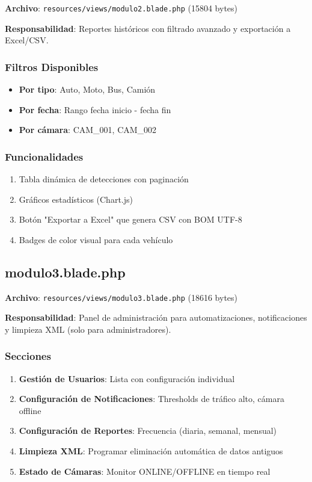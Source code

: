 \documentclass[12pt,a4paper]{article}
\begin{document}
\textbf{Archivo}: \texttt{resources/views/modulo2.blade.php} (15804 bytes)

\textbf{Responsabilidad}: Reportes históricos con filtrado avanzado y exportación a Excel/CSV.

\subsubsection{Filtros Disponibles}

\begin{itemize}
    \item \textbf{Por tipo}: Auto, Moto, Bus, Camión
    \item \textbf{Por fecha}: Rango fecha inicio - fecha fin
    \item \textbf{Por cámara}: CAM\_001, CAM\_002
\end{itemize}

\subsubsection{Funcionalidades}

\begin{enumerate}
    \item Tabla dinámica de detecciones con paginación
    \item Gráficos estadísticos (Chart.js)
    \item Botón "Exportar a Excel" que genera CSV con BOM UTF-8
    \item Badges de color visual para cada vehículo
\end{enumerate}

\subsection{modulo3.blade.php}

\textbf{Archivo}: \texttt{resources/views/modulo3.blade.php} (18616 bytes)

\textbf{Responsabilidad}: Panel de administración para automatizaciones, notificaciones y limpieza XML (solo para administradores).

\subsubsection{Secciones}

\begin{enumerate}
    \item \textbf{Gestión de Usuarios}: Lista con configuración individual
    \item \textbf{Configuración de Notificaciones}: Thresholds de tráfico alto, cámara offline
    \item \textbf{Configuración de Reportes}: Frecuencia (diaria, semanal, mensual)
    \item \textbf{Limpieza XML}: Programar eliminación automática de datos antiguos
    \item \textbf{Estado de Cámaras}: Monitor ONLINE/OFFLINE en tiempo real
\end{enumerate}
\end{document}
